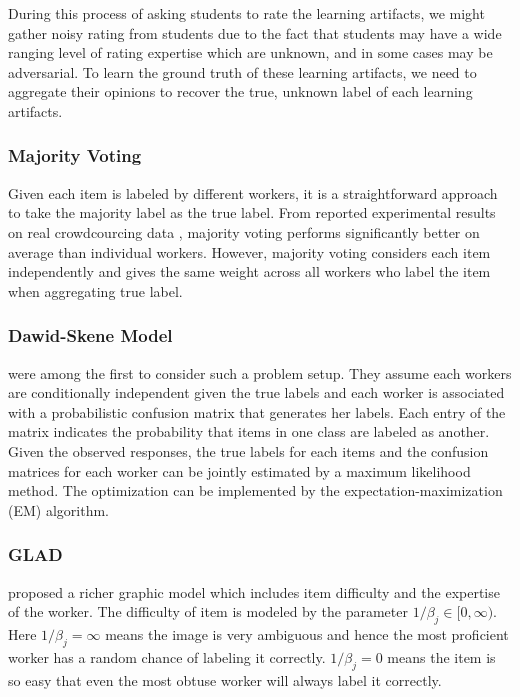 \documentclass{article}
\begin{document}
During this process of asking
students to rate the learning artifacts, we might
gather noisy rating from students due to the fact that students may
have a wide ranging level of rating expertise which are unknown, and
in some cases may be adversarial. To learn the ground truth of these
learning artifacts, we need to aggregate their opinions to recover the
true, unknown label of each learning artifacts.

\subsubsection{Majority Voting}
Given each item is labeled by different workers, it is a
straightforward approach to take the majority label as the true
label. From reported experimental results on real crowdcourcing data
\cite{Snow2008-rm}, majority voting performs significantly better on
average than individual workers. However, majority voting considers
each item independently and gives the same weight across all workers
who label the item when aggregating true label.

\subsubsection{Dawid-Skene Model}
\cite{dawid1979maximum} were among the first to consider such a
problem setup. They assume each workers are conditionally independent
given the true labels and each worker is associated with a
probabilistic confusion matrix that generates her labels. Each entry
of the matrix indicates the probability that items in one class are
labeled as another. Given the
observed responses, the true labels for each items and the confusion
matrices for each worker can be jointly estimated by a maximum
likelihood method. The optimization can be implemented by the
expectation-maximization (EM) algorithm.


\subsubsection{GLAD}
\cite{NIPS2009_3644} proposed a richer graphic model which includes
item difficulty and the expertise of the worker. The difficulty of
item is modeled by the parameter $1/\beta_j \in [0,\infty)$. Here $1/\beta_j = \infty$
means the image is very ambiguous and hence the most proficient worker
has a random chance of labeling it correctly. $1/\beta_j = 0$ means the item is
so easy that even the most obtuse worker will always label it correctly.
\end{document}
